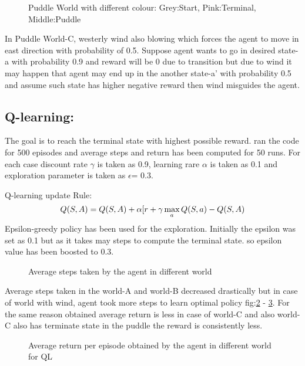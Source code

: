 \documentclass[preprint,12pt]{elsarticle}
\begin{document}
\begin{figure}[H]
	\centering  
	\caption{Puddle World with different colour: Grey:Start, Pink:Terminal, Middle:Puddle }
	\label{fig:puddle}
\end{figure}

In Puddle World-C, westerly wind also blowing which forces the agent to move in east direction with probability of 0.5. Suppose agent wants to go in desired state-a with probability 0.9 and reward will be 0 due to transition but due to wind it may happen that agent may end up in the another state-a' with probability 0.5 and assume such state has higher negative reward then wind misguides the agent.

\subsection{Q-learning:}
The goal is to reach the terminal state with highest possible reward. ran the code for 500 episodes and average steps and return has been computed for 50 runs. 
For each case discount rate $\gamma$ is taken as 0.9, learning rare $\alpha$ is taken as 0.1 and exploration parameter is taken as $\epsilon$= 0.3. 

Q-learning update Rule: \cite{sutton2018reinforcement}
\begin{equation}
Q(S,A) = Q(S,A) + \alpha[r + \gamma \space \max_{a}Q(S,a) -Q(S,A)
\end{equation}
Epsilon-greedy policy has been used for the exploration. Initially the epsilon was set as 0.1 but as it takes may steps to compute the terminal state. so epsilon value has been boosted to 0.3. 

\begin{figure}[H]
	\centering  
	\caption{Average steps taken by the agent in different world}
	\label{fig:stepsQ}
\end{figure}

Average steps taken in the world-A and world-B decreased drastically but  in case of world with wind, agent took more steps to learn optimal policy fig:\ref{fig:stepsQ} - \ref{fig:returnQ}. For the same reason obtained average return is less in case of world-C and also world-C also has terminate state in the puddle the reward is consistently less. 
\begin{figure}[H]
	\centering  
	\caption{Average return per episode obtained by the agent in different world for QL}
	\label{fig:returnQ}
\end{figure}
\end{document}
